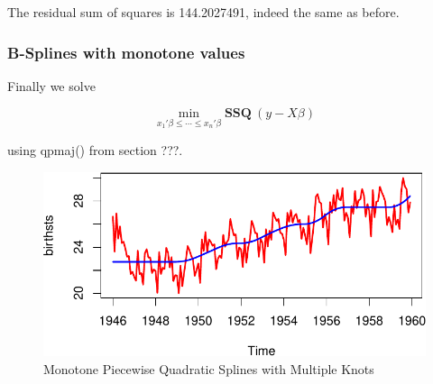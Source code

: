 \documentclass[
  12pt,
  letterpaper,
  DIV=11,
  numbers=noendperiod]{scrreprt}
\newenvironment{Shaded}{\begin{snugshade}}{\end{snugshade}}
\newcommand{\AttributeTok}[1]{\textcolor[rgb]{0.40,0.45,0.13}{#1}}
\newcommand{\FunctionTok}[1]{\textcolor[rgb]{0.28,0.35,0.67}{#1}}
\newcommand{\NormalTok}[1]{\textcolor[rgb]{0.00,0.23,0.31}{#1}}
\newcommand{\OtherTok}[1]{\textcolor[rgb]{0.00,0.23,0.31}{#1}}
\newcommand{\SpecialCharTok}[1]{\textcolor[rgb]{0.37,0.37,0.37}{#1}}
\theoremstyle{remark}
\begin{document}
The residual sum of squares is 144.2027491, indeed the same as before.

\subsubsection{B-Splines with monotone
values}\label{b-splines-with-monotone-values}

Finally we solve

\[
\min_{x_1'\beta\leq\cdots\leq x_n'\beta} \mathbf{SSQ}\ (y-X\beta)
\]

using qpmaj() from section ???.

\begin{Shaded}
\end{Shaded}

\begin{figure}[H]

{\centering \includegraphics{splinical_files/figure-pdf/birthsbsplinesmonotonicplot-1.pdf}

}

\caption{Monotone Piecewise Quadratic Splines with Multiple Knots}

\end{figure}%
\end{document}
